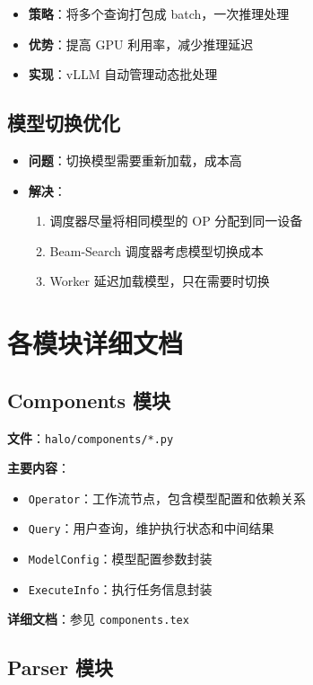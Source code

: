\documentclass[12pt,a4paper]{article}
\begin{document}
\begin{itemize}
    \item \textbf{策略}：将多个查询打包成 batch，一次推理处理
    \item \textbf{优势}：提高 GPU 利用率，减少推理延迟
    \item \textbf{实现}：vLLM 自动管理动态批处理
\end{itemize}

\subsection{模型切换优化}

\begin{itemize}
    \item \textbf{问题}：切换模型需要重新加载，成本高
    \item \textbf{解决}：
    \begin{enumerate}
        \item 调度器尽量将相同模型的 OP 分配到同一设备
        \item Beam-Search 调度器考虑模型切换成本
        \item Worker 延迟加载模型，只在需要时切换
    \end{enumerate}
\end{itemize}

\section{各模块详细文档}

\subsection{Components 模块}

\textbf{文件}：\texttt{halo/components/*.py}

\textbf{主要内容}：
\begin{itemize}
    \item \texttt{Operator}：工作流节点，包含模型配置和依赖关系
    \item \texttt{Query}：用户查询，维护执行状态和中间结果
    \item \texttt{ModelConfig}：模型配置参数封装
    \item \texttt{ExecuteInfo}：执行任务信息封装
\end{itemize}

\textbf{详细文档}：参见 \texttt{components.tex}

\subsection{Parser 模块}
\end{document}
